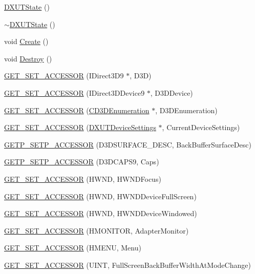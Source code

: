 \begin{DoxyCompactItemize}
\item 
\hyperlink{class_d_x_u_t_state_a6c4887fc291daad529bd9ad62323c600}{DXUTState} ()
\item 
\hyperlink{class_d_x_u_t_state_a342d44fc12982a24def12dcd2c611f85}{$\sim$DXUTState} ()
\item 
void \hyperlink{class_d_x_u_t_state_a10a5fd4f5f0aacb6f0eee2fd52ae3329}{Create} ()
\item 
void \hyperlink{class_d_x_u_t_state_ac3f8f90b21b83e02512519a8423b9c7a}{Destroy} ()
\item 
\hyperlink{class_d_x_u_t_state_af91379ffd21a9d206e8844fb33a8a0f1}{GET\_\-SET\_\-ACCESSOR} (IDirect3D9 $\ast$, D3D)
\item 
\hyperlink{class_d_x_u_t_state_ab61abb00dd9ec46ed0ac175a3c8da16e}{GET\_\-SET\_\-ACCESSOR} (IDirect3DDevice9 $\ast$, D3DDevice)
\item 
\hyperlink{class_d_x_u_t_state_a97b73cb599c484baa4476b379544eaee}{GET\_\-SET\_\-ACCESSOR} (\hyperlink{class_c_d3_d_enumeration}{CD3DEnumeration} $\ast$, D3DEnumeration)
\item 
\hyperlink{class_d_x_u_t_state_ae718d3f29ce272c69ca2f1c4a5785c1d}{GET\_\-SET\_\-ACCESSOR} (\hyperlink{struct_d_x_u_t_device_settings}{DXUTDeviceSettings} $\ast$, CurrentDeviceSettings)
\item 
\hyperlink{class_d_x_u_t_state_a5ea545943abe76448a1ba9200b81d99a}{GETP\_\-SETP\_\-ACCESSOR} (D3DSURFACE\_\-DESC, BackBufferSurfaceDesc)
\item 
\hyperlink{class_d_x_u_t_state_aa7a2337209f6a049279f2e906c51a582}{GETP\_\-SETP\_\-ACCESSOR} (D3DCAPS9, Caps)
\item 
\hyperlink{class_d_x_u_t_state_a9cfa587aab5d6f88711e558ae4d5f6b1}{GET\_\-SET\_\-ACCESSOR} (HWND, HWNDFocus)
\item 
\hyperlink{class_d_x_u_t_state_a8132d1d49aa7bf1fbf06c3f85d0f0658}{GET\_\-SET\_\-ACCESSOR} (HWND, HWNDDeviceFullScreen)
\item 
\hyperlink{class_d_x_u_t_state_a5011c6600f15959fd9d4b7be0e44d520}{GET\_\-SET\_\-ACCESSOR} (HWND, HWNDDeviceWindowed)
\item 
\hyperlink{class_d_x_u_t_state_a2efcc409c149447da53fa144e55ec0b2}{GET\_\-SET\_\-ACCESSOR} (HMONITOR, AdapterMonitor)
\item 
\hyperlink{class_d_x_u_t_state_a4a8b78386039a9860998de7d43d2e393}{GET\_\-SET\_\-ACCESSOR} (HMENU, Menu)
\item 
\hyperlink{class_d_x_u_t_state_a40576f264b555cf8e304dd84ffa60091}{GET\_\-SET\_\-ACCESSOR} (UINT, FullScreenBackBufferWidthAtModeChange)

\end{DoxyCompactItemize}

